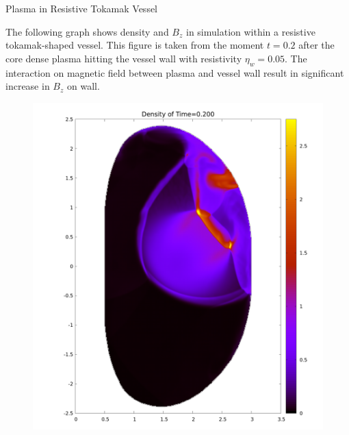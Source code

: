 \documentclass[final]{beamer}
\begin{document}
\begin{frame}{}
\begin{textblock}{19.0}
\begin{block}{Plasma in Resistive Tokamak Vessel}
	\begin{minipage}{0.93\linewidth}
		\justifying
		The following graph shows density and $B_z$ in simulation within a resistive tokamak-shaped vessel. This figure is taken from the moment $t=0.2$ after the core dense plasma hitting the vessel wall with resistivity $\eta_w=0.05$. The interaction on magnetic field between plasma and vessel wall result in significant increase in $B_z$ on wall.\\
		\begin{figure}
			\begin{minipage}{0.48\linewidth}
				\includegraphics[width = \linewidth]{Poster_Density_100.png}
			\end{minipage}
			\hspace{-0.6cm}
			\begin{minipage}{0.48\linewidth}

\end{minipage}
\end{figure}
\end{minipage}
\end{block}
\end{textblock}
\end{frame}
\end{document}
